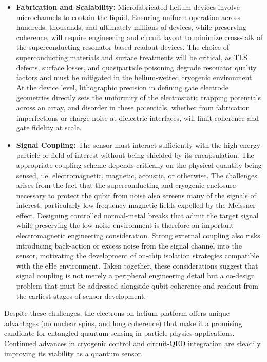 \documentclass[fleqn,10pt]{wlscirep}
\begin{document}
\begin{itemize}
\item {\bf Fabrication and Scalability:} Microfabricated helium devices involve microchannels to contain the liquid.  Ensuring uniform operation across hundreds, thousands, and ultimately millions of devices, while preserving coherence, will require engineering and circuit layout to minimize cross-talk of the superconducting resonator-based readout devices. The choice of superconducting materials and surface treatments will be critical, as TLS defects, surface losses, and quasiparticle poisoning degrade resonator quality factors and must be mitigated in the helium-wetted cryogenic environment. At the device level, lithographic precision in defining gate electrode geometries directly sets the uniformity of the electrostatic trapping potentials across an array, and disorder in these potentials, whether from fabrication imperfections or charge noise at dielectric interfaces, will limit coherence and gate fidelity at scale.  
\item {\bf Signal Coupling:} The sensor must interact sufficiently with the high-energy particle or field of interest without being shielded by its encapsulation. The appropriate coupling scheme depends critically on the physical quantity being sensed, i.e. electromagnetic, magnetic, acoustic, or otherwise. The challenges arises from the fact that the superconducting and cryogenic enclosure necessary to protect the qubit from noise also screens many of the signals of interest, particularly low-frequency magnetic fields expelled by the Meissner effect. Designing controlled normal-metal breaks that admit the target signal while preserving the low-noise environment is therefore an important electromagnetic engineering consideration. Strong external coupling also risks introducing back-action or excess noise from the signal channel into the sensor, motivating the development of on-chip isolation strategies compatible with the eHe environment. Taken together, these considerations suggest that signal coupling is not merely a peripheral engineering detail but a co-design problem that must be addressed alongside qubit coherence and readout from the earliest stages of sensor development.
\end{itemize}

Despite these challenges, the electrons-on-helium platform offers unique advantages (no nuclear spins, and long coherence) that make it a promising candidate for entangled quantum sensing in particle physics applications.  Continued advances in cryogenic control and circuit-QED integration are steadily improving its viability as a quantum sensor.
\end{document}
